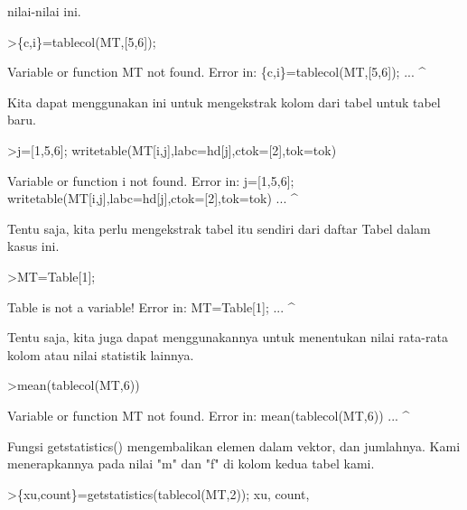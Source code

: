 \documentclass[a4paper,10pt]{article}
\begin{document}
\begin{eulernotebook}
\begin{eulercomment}
\begin{eulercomment}
\begin{eulercomment}
\begin{eulercomment}
\begin{eulercomment}
\begin{eulercomment}
\begin{eulercomment}
\begin{eulercomment}
\begin{eulercomment}
\begin{eulercomment}
\begin{eulercomment}
\begin{eulercomment}
\begin{eulercomment}
\begin{eulercomment}
\begin{eulercomment}
\begin{eulercomment}
\begin{eulercomment}
\begin{eulercomment}
\begin{eulercomment}
nilai-nilai ini.
\end{eulercomment}
\begin{eulerprompt}
>\{c,i\}=tablecol(MT,[5,6]);
\end{eulerprompt}
\begin{euleroutput}
  Variable or function MT not found.
  Error in:
  \{c,i\}=tablecol(MT,[5,6]); ...
                   ^
\end{euleroutput}
\begin{eulercomment}
Kita dapat menggunakan ini untuk mengekstrak kolom dari tabel untuk
tabel baru.
\end{eulercomment}
\begin{eulerprompt}
>j=[1,5,6]; writetable(MT[i,j],labc=hd[j],ctok=[2],tok=tok)
\end{eulerprompt}
\begin{euleroutput}
  Variable or function i not found.
  Error in:
  j=[1,5,6]; writetable(MT[i,j],labc=hd[j],ctok=[2],tok=tok) ...
                            ^
\end{euleroutput}
\begin{eulercomment}
Tentu saja, kita perlu mengekstrak tabel itu sendiri dari daftar Tabel
dalam kasus ini.
\end{eulercomment}
\begin{eulerprompt}
>MT=Table[1];
\end{eulerprompt}
\begin{euleroutput}
  Table is not a variable!
  Error in:
  MT=Table[1]; ...
             ^
\end{euleroutput}
\begin{eulercomment}
Tentu saja, kita juga dapat menggunakannya untuk menentukan nilai
rata-rata kolom atau nilai statistik lainnya.
\end{eulercomment}
\begin{eulerprompt}
>mean(tablecol(MT,6))
\end{eulerprompt}
\begin{euleroutput}
  Variable or function MT not found.
  Error in:
  mean(tablecol(MT,6)) ...
                  ^
\end{euleroutput}
\begin{eulercomment}
Fungsi getstatistics() mengembalikan elemen dalam vektor, dan
jumlahnya. Kami menerapkannya pada nilai "m" dan "f" di kolom kedua
tabel kami.
\end{eulercomment}
\begin{eulerprompt}
>\{xu,count\}=getstatistics(tablecol(MT,2)); xu, count,

\end{eulerprompt}
\end{eulercomment}
\end{eulercomment}
\end{eulercomment}
\end{eulercomment}
\end{eulercomment}
\end{eulercomment}
\end{eulercomment}
\end{eulercomment}
\end{eulercomment}
\end{eulercomment}
\end{eulercomment}
\end{eulercomment}
\end{eulercomment}
\end{eulercomment}
\end{eulercomment}
\end{eulercomment}
\end{eulercomment}
\end{eulercomment}
\end{eulernotebook}
\end{document}
